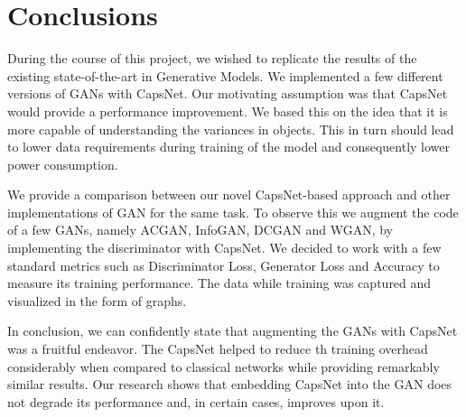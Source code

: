 \documentclass{vldb}
\begin{document}
\section{Conclusions}
During the course of this project, we wished to replicate the results of the existing state-of-the-art in Generative Models. We implemented a few different versions of GANs with CapsNet. Our motivating assumption was that CapsNet would provide a performance improvement. We based this on the idea that it is more capable of understanding the variances in objects. This in turn should lead to lower data requirements during training of the model and consequently lower power consumption. 
\par\bigskip 

We provide a comparison between our novel CapsNet-based approach and other implementations of GAN for the same task. To observe this we augment the code of a few GANs, namely ACGAN, InfoGAN, DCGAN and WGAN, by implementing the discriminator with CapsNet. We decided to work with a few standard metrics such as Discriminator Loss, Generator Loss and Accuracy to measure its training performance. The data while training was captured and visualized in the form of graphs.
\par\bigskip 



In conclusion, we can confidently state that augmenting the GANs with CapsNet was a fruitful endeavor. The CapsNet helped to reduce th training overhead considerably when compared to classical networks while providing remarkably similar results. Our research shows that embedding CapsNet into the GAN does not degrade its performance and, in certain cases, improves upon it.

\balance

\end{document}
